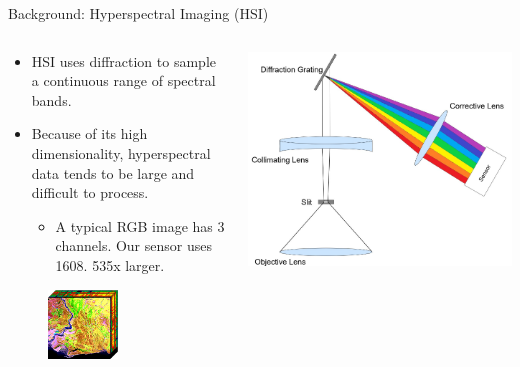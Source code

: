 \documentclass[aspectratio=169,xcolor=dvipsnames]{beamer}
\begin{document}
\begin{frame}{Background: Hyperspectral Imaging (HSI)}
    \begin{columns}
        \begin{column}{0.48\textwidth}
            \begin{itemize}
                \item HSI uses diffraction to sample a continuous range of spectral bands.
                \item Because of its high dimensionality, hyperspectral data tends to be large and difficult to process.
                      \begin{itemize}
                          \item A typical RGB image has 3 channels. Our sensor uses 1608. 535x larger.
                      \end{itemize}
            \end{itemize}
            \begin{figure}
                \centering
                \includegraphics[width=0.5\textwidth]{datacube.png}
            \end{figure}
        \end{column}
        \begin{column}{0.48\textwidth}
            \includegraphics[width=\textwidth]{hsi_optics.png}


\end{column}
\end{columns}
\end{frame}
\end{document}
